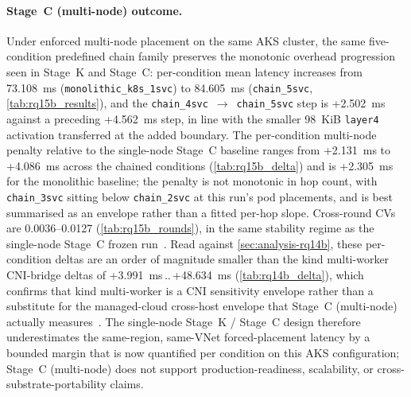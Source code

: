 \paragraph{Stage~C (multi-node) outcome.}
Under enforced multi-node placement on the same AKS cluster, the same
five-condition predefined chain family preserves the monotonic overhead
progression seen in Stage~K and Stage~C: per-condition mean latency increases
from 73.108~ms (\texttt{monolithic\_k8s\_1svc}) to 84.605~ms
(\texttt{chain\_5svc}, \cref{tab:rq15b_results}), and the
\texttt{chain\_4svc}~$\rightarrow$~\texttt{chain\_5svc} step is +2.502~ms
against a preceding +4.562~ms step, in line with the smaller 98~KiB
\texttt{layer4} activation transferred at the added boundary. The
per-condition multi-node penalty relative to the single-node Stage~C
baseline ranges from +2.131~ms to +4.086~ms across the chained conditions
(\cref{tab:rq15b_delta}) and is +2.305~ms for the monolithic baseline; the
penalty is not monotonic in hop count, with \texttt{chain\_3svc} sitting
below \texttt{chain\_2svc} at this run's pod placements, and is best
summarised as an envelope rather than a fitted per-hop slope. Cross-round
CVs are 0.0036--0.0127 (\cref{tab:rq15b_rounds}), in the same stability
regime as the single-node Stage~C frozen run~\cite{benchmarking_sc15}.
Read against \cref{sec:analysis-rq14b}, these per-condition deltas are an
order of magnitude smaller than the kind multi-worker CNI-bridge deltas
of +3.991~ms\,..\,+48.634~ms (\cref{tab:rq14b_delta}), which confirms
that kind multi-worker is a CNI sensitivity envelope rather than a
substitute for the managed-cloud cross-host envelope that Stage~C (multi-node) actually
measures~\cite{cni_k8s_ic2e21,virtualization_costs}. The single-node
Stage~K / Stage~C design therefore underestimates the same-region, same-VNet
forced-placement latency by a bounded margin that is now quantified per condition on
this AKS configuration; Stage~C (multi-node) does not support production-readiness, scalability,
or cross-substrate-portability claims.
